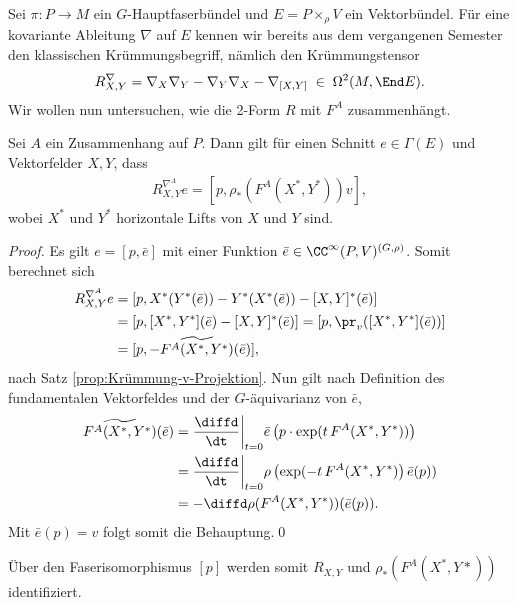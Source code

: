 \documentclass[%
	paper=a5,%
	fleqn,%
	DIV=18,%
	BCOR=0mm,
	fontsize=11pt,
	titlepage=false,%
	bibliography=totoc,
	DIV=18,%
	twoside=true,
	pdftitle=Riemannsche Geometrie,
	pdfauthor=Uwe Semmelmann,
	numbers=noendperiod]%
	{scrbook}
\begin{document}
Sei $\pi: P\to M$ ein $G$-Hauptfaserbündel und $E= P\times_\rho V$ ein
Vektorbündel. Für eine kovariante Ableitung $\nabla$ auf $E$ kennen wir bereits
aus dem vergangenen Semester den klassischen Krümmungsbegriff, nämlich den
Krümmungstensor
\begin{align*}
R_{X,Y}^\nabla = \nabla_X\nabla_Y - \nabla_Y\nabla_X - \nabla_{[X,Y]} \;\in\;
\Omega^2(M,\End E).
\end{align*}
Wir wollen nun untersuchen, wie die 2-Form $R$ mit $F^A$ zusammenhängt.

\begin{prop}
Sei $A$ ein Zusammenhang auf $P$. Dann gilt für einen Schnitt $e\in \Gamma(E)$
und Vektorfelder $X,Y$, dass
\begin{align*}
R_{X,Y}^{\nabla^A}e = [p,\rho_*(F^A(X^*,Y^*))v],
\end{align*}
wobei $X^*$ und $Y^*$ horizontale Lifts von $X$ und $Y$ sind.\fish
\end{prop}
\begin{proof}
Es gilt $e=[p,\bar{e}]$ mit einer Funktion $\bar{e}\in
\CC^\infty(P,V)^{(G,\rho)}$. Somit berechnet sich
\begin{align*}
R_{X,Y}^{\nabla^A}e &=
[p,X^*(Y^*(\bar{e}))-Y^*(X^*(\bar{e}))-[X,Y]^*(\bar{e})]\\ &= [p,[X^*,Y^*](\bar{e})-[X,Y]^*(\bar{e})]
= [p,\pr_v([X^*,Y^*](\bar{e}))]\\
&= [p,-\widetilde{F^A(X^*,Y^*)}(\bar{e})],
\end{align*}
nach Satz \ref{prop:Krümmung-v-Projektion}. Nun gilt nach Definition des fundamentalen Vektorfeldes und
der $G$-äquivarianz von $\bar{e}$,
\begin{align*}
\widetilde{F^A(X^*,Y^*)}(\bar{e}) &= 
\frac{\diffd}{\dt}\bigg|_{t=0}\bar{e}\left(p\cdot \exp(t\, F^A(X^*,Y^*))
\right)\\
&=\frac{\diffd}{\dt}\bigg|_{t=0}
\rho\left(\exp(-t\, F^A(X^*,Y^*)\right)
\bar{e}(p) )\\
&=-\diffd\rho(F^A(X^*,Y^*))(\bar{e}(p)). 
\end{align*}
Mit $\bar{e}(p) = v$ folgt somit die Behauptung.\qed
\end{proof}

Über den Faserisomorphismus $[p]$ werden somit $R_{X,Y}$ und
$\rho_*(F^A(X^*,Y*))$ identifiziert. 
\end{document}

